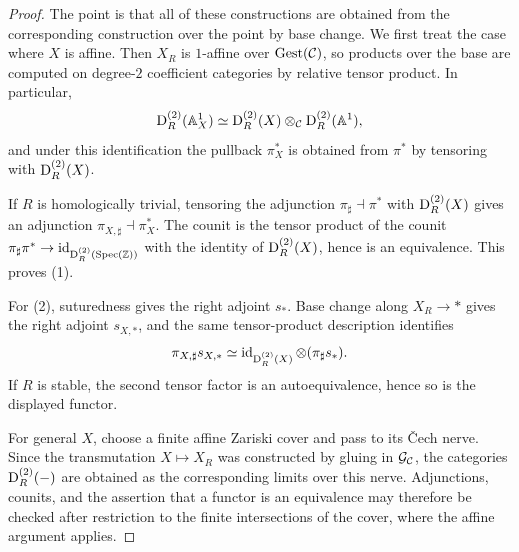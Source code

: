 \documentclass[11pt]{book}
\begin{document}
	\begin{proof}
		The point is that all of these constructions are obtained from the corresponding construction over the point by base change. We first treat the case where \(X\) is affine. Then \(X_R\) is \(1\)-affine over \({\textup{Gest}}(\mathcal{C})\), so products over the base are computed on degree-\(2\) coefficient categories by relative tensor product. In particular,
		\[
			\operatorname{\mathrm{D}}^{(2)}_R(\mathbb{A}^1_X)
			\simeq
			\operatorname{\mathrm{D}}^{(2)}_R(X)\otimes_{\mathcal{C}}\operatorname{\mathrm{D}}^{(2)}_R(\mathbb{A}^1),
		\]
		and under this identification the pullback $\pi_X^*$ is obtained from $\pi^*$ by tensoring with $\operatorname{\mathrm{D}}^{(2)}_R(X)$.

		If $R$ is homologically trivial, tensoring the adjunction $\pi_\sharp\dashv\pi^*$ with $\operatorname{\mathrm{D}}^{(2)}_R(X)$ gives an adjunction $\pi_{X,\sharp}\dashv\pi_X^*$. The counit is the tensor product of the counit $\pi_\sharp\pi^*\to\operatorname{id}_{\operatorname{\mathrm{D}}^{(2)}_R(\operatorname{Spec}(\operatorname{\mathbb Z}))}$ with the identity of $\operatorname{\mathrm{D}}^{(2)}_R(X)$, hence is an equivalence. This proves (1).

		For (2), suturedness gives the right adjoint $s_*$. Base change along $X_R\to *$ gives the right adjoint $s_{X,*}$, and the same tensor-product description identifies
		\[
			\pi_{X,\sharp}s_{X,*}
			\simeq
			\operatorname{id}_{\operatorname{\mathrm{D}}^{(2)}_R(X)}\otimes(\pi_\sharp s_*).
		\]
		If $R$ is stable, the second tensor factor is an autoequivalence, hence so is the displayed functor.

		For general \(X\), choose a finite affine Zariski cover and pass to its \v{C}ech nerve. Since the transmutation \(X\mapsto X_R\) was constructed by gluing in \(\mathcal{G}_{\mathcal{C}}\), the categories \(\operatorname{\mathrm{D}}^{(2)}_R(-)\) are obtained as the corresponding limits over this nerve. Adjunctions, counits, and the assertion that a functor is an equivalence may therefore be checked after restriction to the finite intersections of the cover, where the affine argument applies.
	\end{proof}
\end{document}
